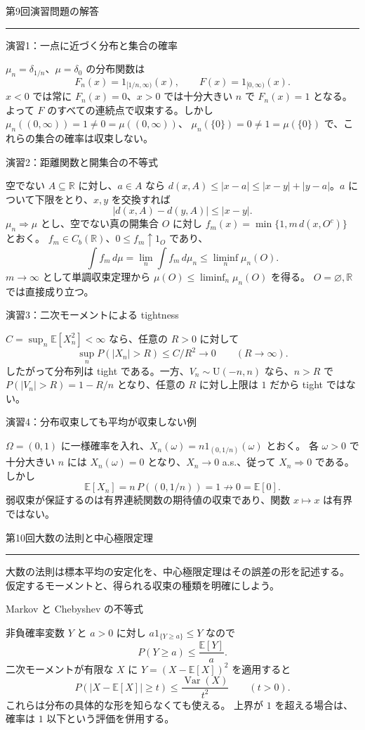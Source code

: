 \documentclass[a4paper,10pt,pdflatex,ja=standard,jafont=ipaex-type1,
  magstyle=real,scale=1]{bxjsarticle}
\newcommand{\coursename}{確率論と統計学 I}
\newcommand{\topic}[1]{\par\vspace{5pt}
  {\large\sffamily\mdseries\color{accent}#1}\par\vspace{2pt}}
\newcommand{\handouttitle}[1]{%
  \begin{center}
    {\Large\color{ink}#1}\par\vspace{3mm}
    {\color{accent}\rule{0.88\linewidth}{0.7pt}}
  \end{center}\vspace{-2mm}}
\newcommand{\keybox}[1]{\par\vspace{3pt}\begingroup
  \setlength{\fboxsep}{5pt}
  \colorbox{soft}{\parbox{\dimexpr\linewidth-2\fboxsep\relax}{#1}}%
  \endgroup\par\vspace{2pt}}
\newcommand{\R}{\mathbb R}
\newcommand{\E}{\mathbb E}
\newcommand{\Var}{\operatorname{Var}}
\newcommand{\ind}{\mathrm{1}}
\begin{document}
\fontsize{10pt}{13.5pt}\selectfont
\begingroup
\fancyhead[L]{\small\color{ink}\coursename{}・前回の演習解答}
\handouttitle{第9回\quad 演習問題の解答}

\topic{演習1：一点に近づく分布と集合の確率}
$\mu_n=\delta_{1/n}$、$\mu=\delta_0$ の分布関数は
$$
  F_n(x)=\ind_{[1/n,\infty)}(x),\qquad F(x)=\ind_{[0,\infty)}(x).
$$
$x<0$ では常に $F_n(x)=0$、$x>0$ では十分大きい $n$ で $F_n(x)=1$ となる。
よって $F$ のすべての連続点で収束する。しかし
$\mu_n((0,\infty))=1\ne0=\mu((0,\infty))$、
$\mu_n(\{0\})=0\ne1=\mu(\{0\})$ で、これらの集合の確率は収束しない。

\topic{演習2：距離関数と開集合の不等式}
空でない $A\subseteq\R$ に対し、$a\in A$ なら
$d(x,A)\le|x-a|\le|x-y|+|y-a|$。$a$ について下限をとり、$x,y$ を交換すれば
$$|d(x,A)-d(y,A)|\le|x-y|.$$
$\mu_n\Rightarrow\mu$ とし、空でない真の開集合 $O$ に対し
$f_m(x)=\min\{1,m\,d(x,O^c)\}$ とおく。
$f_m\in C_b(\R)$、$0\le f_m\uparrow\ind_O$ であり、
$$
  \int f_m\,d\mu=\lim_n\int f_m\,d\mu_n
     \le\liminf_n\mu_n(O).
$$
$m\to\infty$ として単調収束定理から $\mu(O)\le\liminf_n\mu_n(O)$ を得る。
$O=\varnothing,\R$ では直接成り立つ。

\topic{演習3：二次モーメントによる tightness}
$C=\sup_n\E[X_n^2]<\infty$ なら、任意の $R>0$ に対して
$$\sup_nP(|X_n|>R)\le C/R^2\longrightarrow0\qquad(R\to\infty).$$
したがって分布列は tight である。一方、$V_n\sim\mathrm U(-n,n)$ なら、$n>R$ で
$P(|V_n|>R)=1-R/n$ となり、任意の $R$ に対し上限は $1$ だから tight ではない。

\topic{演習4：分布収束しても平均が収束しない例}
$\Omega=(0,1)$ に一様確率を入れ、$X_n(\omega)=n\ind_{(0,1/n)}(\omega)$ とおく。
各 $\omega>0$ で十分大きい $n$ には $X_n(\omega)=0$ となり、$X_n\to0$ a.s.、従って
$X_n\Rightarrow0$ である。しかし
$$\E[X_n]=n\,P((0,1/n))=1\not\longrightarrow0=\E[0].$$
弱収束が保証するのは有界連続関数の期待値の収束であり、関数 $x\mapsto x$ は有界ではない。
\clearpage
\endgroup

\handouttitle{第10回\quad 大数の法則と中心極限定理}
\keybox{大数の法則は標本平均の安定化を、中心極限定理はその誤差の形を記述する。
仮定するモーメントと、得られる収束の種類を明確にしよう。}

\topic{Markov と Chebyshev の不等式}
非負確率変数 $Y$ と $a>0$ に対し $a\ind_{\{Y\ge a\}}\le Y$ なので
$$P(Y\ge a)\le\frac{\E[Y]}a.$$
二次モーメントが有限な $X$ に $Y=(X-\E[X])^2$ を適用すると
$$P(|X-\E[X]|\ge t)\le\frac{\Var(X)}{t^2}\qquad(t>0).$$
これらは分布の具体的な形を知らなくても使える。
上界が $1$ を超える場合は、確率は $1$ 以下という評価を併用する。
\end{document}

